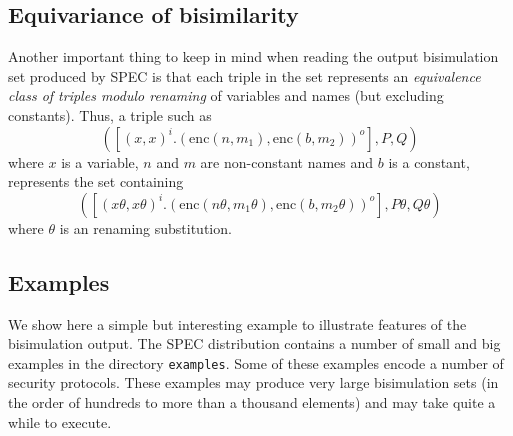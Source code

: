 \documentclass{article}
\begin{document}
\subsection{Equivariance of bisimilarity}

Another important thing to keep in mind when reading the output bisimulation set
produced by SPEC is that each triple in the set represents an
{\em equivalence class of triples modulo renaming} of variables and names (but excluding constants). Thus, a triple such as 
$$
([(x,x)^i.(\mathrm{enc}(n,m_1), \mathrm{enc}(b,m_2))^o], P, Q)
$$
where $x$ is a variable, $n$ and $m$ are non-constant names and $b$ is a constant, represents the set containing 
$$
([(x\theta,x\theta)^i.(\mathrm{enc}(n\theta,m_1\theta), \mathrm{enc}(b,m_2\theta))^o], P\theta, Q\theta)
$$
where $\theta$ is an renaming substitution.

\subsection{Examples}


We show here a simple but interesting example to illustrate features of the bisimulation output. 
The SPEC distribution contains a number of small and big examples in the directory \texttt{examples}.
Some of these examples encode a number of security protocols. These examples may produce
very large bisimulation sets (in the order of hundreds to more than a thousand elements) 
and may take quite a while to execute.
\end{document}
